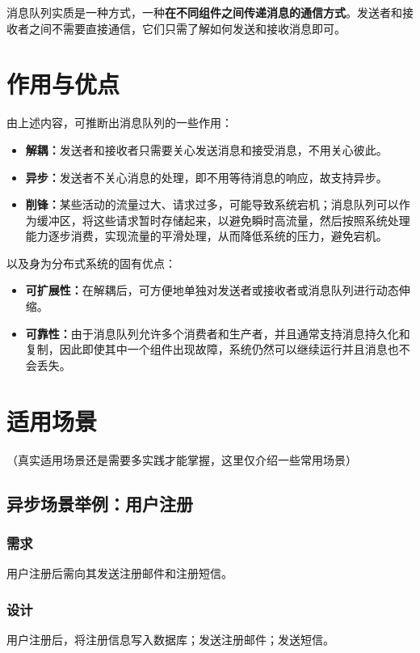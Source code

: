 \documentclass[11pt, a4paper, oneside]{ctexbook}
\let\kaishu\relax                               %
\begin{document}
消息队列实质是一种方式，一种{\bfseries\kaishu 在不同组件之间传递消息的通信方式}。发送者和接收者之间不需要直接通信，它们只需了解如何发送和接收消息即可。

\section{作用与优点}
由上述内容，可推断出消息队列的一些作用：
\begin{itemize}
  \item {\bfseries\kaishu 解耦：}发送者和接收者只需要关心发送消息和接受消息，不用关心彼此。
  \item {\bfseries\kaishu 异步：}发送者不关心消息的处理，即不用等待消息的响应，故支持异步。
  \item {\bfseries\kaishu 削锋：}某些活动的流量过大、请求过多，可能导致系统宕机；消息队列可以作为缓冲区，将这些请求暂时存储起来，以避免瞬时高流量，然后按照系统处理能力逐步消费，实现流量的平滑处理，从而降低系统的压力，避免宕机。
\end{itemize}

以及身为分布式系统的固有优点：
\begin{itemize}
  \item {\bfseries\kaishu 可扩展性：}在解耦后，可方便地单独对发送者或接收者或消息队列进行动态伸缩。
  \item {\bfseries\kaishu 可靠性：}由于消息队列允许多个消费者和生产者，并且通常支持消息持久化和复制，因此即使其中一个组件出现故障，系统仍然可以继续运行并且消息也不会丢失。
\end{itemize}

\section{适用场景}
（真实适用场景还是需要多实践才能掌握，这里仅介绍一些常用场景）
\subsection{异步场景举例：用户注册}
\subsubsection{需求}
用户注册后需向其发送注册邮件和注册短信。

\subsubsection{设计}
用户注册后，将注册信息写入数据库；发送注册邮件；发送短信。
\end{document}
